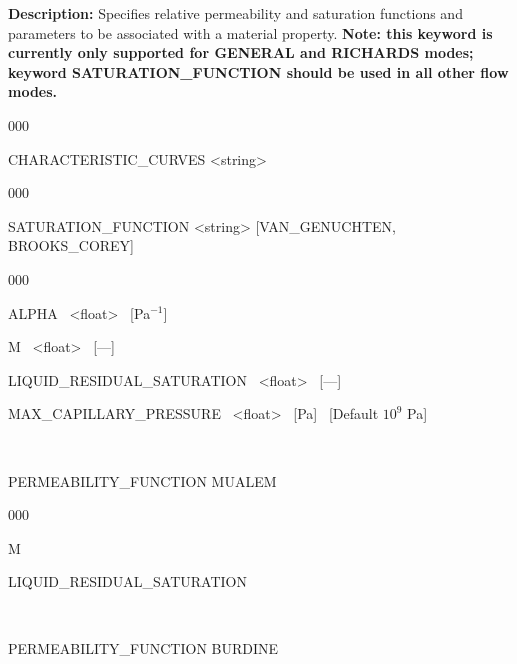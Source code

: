 {\noindent\bf Description:} Specifies relative permeability and saturation functions and parameters to be associated with a material property. 
{\bf Note: this keyword is currently only supported for GENERAL and RICHARDS modes; keyword SATURATION\_FUNCTION should be used in all other flow modes.}

\hfill\hyperlink{target_key}{\return}




\begin{deflist}{000}
\item [CHARACTERISTIC\_CURVES] <string>

\begin{deflist}{000}

\item [SATURATION\_FUNCTION] <string> [VAN\_GENUCHTEN, BROOKS\_COREY]
\begin{deflist}{000}
\item ALPHA \ <float> \ [Pa$^{-1}$]
\item M \ <float> \ [---]
\item LIQUID\_RESIDUAL\_SATURATION \ <float> \ [---]
\item MAX\_CAPILLARY\_PRESSURE \ <float> \ [Pa] \ [Default $10^{9}$ Pa]
\end{deflist}
\item [\keyend] ~

\item [PERMEABILITY\_FUNCTION] MUALEM
\begin{deflist}{000}
\item M
\item LIQUID\_RESIDUAL\_SATURATION
\end{deflist}
\item [\keyend] ~

\item [PERMEABILITY\_FUNCTION] BURDINE


\end{deflist}
\end{deflist}
